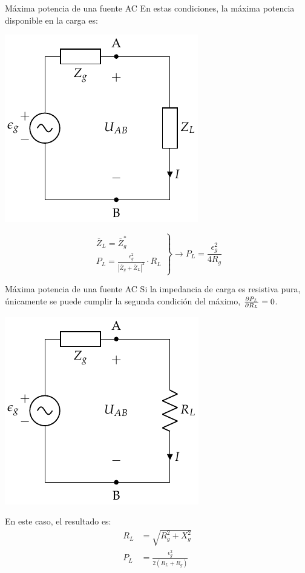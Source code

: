 \documentclass[aspectratio=169, usenames,svgnames,dvipsnames]{beamer}
\begin{document}
\begin{frame}[label={sec:orge99dfd5}]{Máxima potencia de una fuente AC}
En estas condiciones, la máxima potencia disponible en la carga es:
\begin{center}
\includegraphics[height=0.45\textheight]{../figs/FuenteTensionRealACConCarga.pdf}
\end{center}

\begin{equation*}
  \left.
    \begin{matrix}
      \overline{Z}_L = \overline{Z}_g^*\\
      P_L = \frac{\epsilon^2_g}{|\overline{Z}_g + \overline{Z}_L|^2} \cdot R_L
    \end{matrix} \right\}\rightarrow
  \boxed{P_L = \frac{\epsilon^2_g}{4 R_g}}
\end{equation*}
\end{frame}

\begin{frame}[label={sec:org55a0d99}]{Máxima potencia de una fuente AC}
Si la impedancia de carga es resistiva pura, únicamente se puede cumplir la segunda condición del máximo, \(\diffp{P_L}{R_L} = 0\).
\begin{center}
\includegraphics[height=0.4\textheight]{../figs/FuenteTensionRealACConCargaR.pdf}
\end{center}

En este caso, el resultado es:
\begin{align*}
      R_L &= \sqrt{R_g^2 + X_g^2}\\
      P_L &= \frac{\epsilon^2_g}{2(R_L + R_g)}
\end{align*}
\end{frame}
\end{document}
